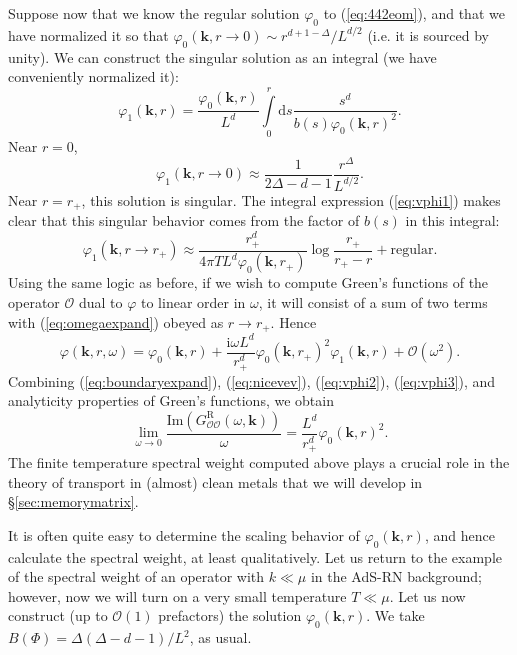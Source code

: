 \documentclass[10pt, oneside]{book}
\begin{document}
\begin{doublespace}
Suppose now that we know the regular solution $\varphi_0$ to (\ref{eq:442eom}), and that we have normalized it so that $\varphi_0(\mathbf{k},r\rightarrow 0) \sim r^{d+1-\Delta} /L^{d/2}$ (i.e. it is sourced by unity).  We can construct the singular solution as an integral (we have conveniently normalized it): \begin{equation}
\varphi_1(\mathbf{k},r) = \frac{\varphi_0(\mathbf{k},r)}{L^d} \int \limits_0^r \mathrm{d}s \frac{s^d}{b(s)\varphi_0(\mathbf{k},r)^2}.  \label{eq:vphi1}
\end{equation}Near $r=0$, \begin{equation}
\varphi_1(\mathbf{k},r\rightarrow 0) \approx \frac{1}{2\Delta-d-1}\frac{r^\Delta}{L^{d/2}}.   \label{eq:vphi2}
\end{equation}
Near $r=r_+$, this solution is singular.   The integral expression (\ref{eq:vphi1}) makes clear that this singular behavior comes from the factor of $b(s)$ in this integral: \begin{equation}
\varphi_1(\mathbf{k}, r\rightarrow r_+) \approx \frac{r_+^d}{4\pi TL^d \varphi_0(\mathbf{k},r_+)}\log \frac{r_+}{r_+-r} + \text{regular}.
\end{equation}
Using the same logic as before, if we wish to compute Green's functions of the operator $\mathcal{O}$ dual to $\varphi$ to linear order in $\omega$, it will consist of a sum of two terms with (\ref{eq:omegaexpand}) obeyed as $r\rightarrow r_+$.  Hence \begin{equation}
\varphi(\mathbf{k},r,\omega) = \varphi_0(\mathbf{k},r) + \frac{\mathrm{i}\omega L^d}{r_+^d} \varphi_0(\mathbf{k},r_+)^2 \varphi_1(\mathbf{k},r) + \mathcal{O}\left(\omega^2\right).  \label{eq:vphi3}
\end{equation}
Combining (\ref{eq:boundaryexpand}), (\ref{eq:nicevev}), (\ref{eq:vphi2}), (\ref{eq:vphi3}),  and analyticity properties of Green's functions, we obtain \begin{equation}
\lim_{\omega \rightarrow 0} \frac{\mathrm{Im}\left(G^{\mathrm{R}}_{\mathcal{OO}}(\omega,\mathbf{k})\right)}{\omega} = \frac{L^d}{r_+^d} \varphi_0(\mathbf{k},r)^2.   \label{eq:SWT}
\end{equation}
The finite temperature spectral weight computed above plays a crucial role in the theory of transport in (almost) clean metals that we will develop in \S \ref{sec:memorymatrix}.

It is often quite easy to determine the scaling behavior of $\varphi_0(\mathbf{k},r)$, and hence calculate the spectral weight, at least qualitatively.   Let us return to the example of the spectral weight of an operator with $k \ll \mu$ in the AdS-RN background;  however, now we will turn on a very small temperature $T\ll \mu$.   Let us now construct (up to $\mathcal{O}(1)$ prefactors) the solution $\varphi_0(\mathbf{k},r)$.  We take $B(\Phi) = \Delta(\Delta-d-1)/L^2$, as usual.    


\end{doublespace}
\end{document}
